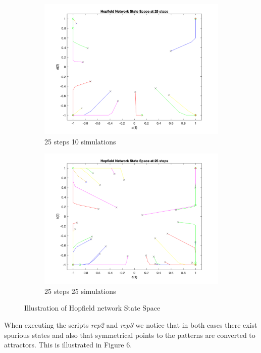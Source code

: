 \documentclass[11pt,conference,compsoc]{IEEEtran}
\begin{document}
\begin{figure}[]
\begin{subfigure}{0.33\linewidth}
        \includegraphics[width=\linewidth]{images/hopfield1_25steps_10sims.png}
        \caption{25 steps 10 simulations}
    \end{subfigure}
    \begin{subfigure}{0.33\linewidth}
        \includegraphics[width=\linewidth]{images/hopfield1_25steps_25sims.png}
        \caption{25 steps 25 simulations}
    \end{subfigure}
    
    \caption{ Illustration of Hopfield network State Space}
    \label{fig:5}    
    
\end{figure}

When executing the scripts \textit{rep2} and \textit{rep3} we notice that in both cases there exist spurious states and also that symmetrical points to the patterns are converted to attractors. This is illustrated in Figure 6.
\end{document}
